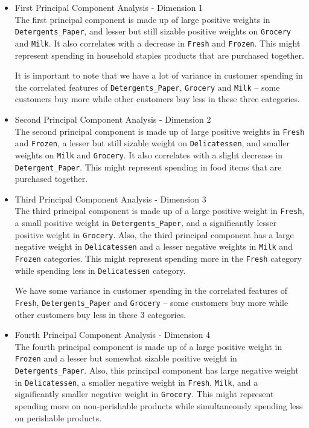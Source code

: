 \documentclass[twoside,openright,titlepage,numbers=noenddot,headinclude,%
               footinclude=true,cleardoublepage=empty,abstractoff,BCOR=5mm,%
               paper=a4,fontsize=11pt,ngerman,american]{scrreprt}
\numberwithin{theorem}{chapter}
\numberwithin{definition}{chapter}
\numberwithin{algorithm}{chapter}
\numberwithin{figure}{chapter}
\numberwithin{table}{chapter}
\numberwithin{equation}{chapter}
\begin{document}
\begin{itemize}

\item First Principal Component Analysis - Dimension 1 \\
The first principal component is made up of large positive weights in \texttt{Detergents\_Paper}, and lesser but still sizable positive weights on \texttt{Grocery} and \texttt{Milk}. It also correlates with a decrease in \texttt{Fresh} and \texttt{Frozen}. This might represent spending in household staples products that are purchased together. 

It is important to note that we have a lot of variance in customer spending in the correlated features of \texttt{Detergents\_Paper}, \texttt{Grocery} and \texttt{Milk} -- some customers buy more while other customers buy less in these three categories.

\item Second Principal Component Analysis - Dimension 2\\
The second principal component is made up of large positive weights in \texttt{Fresh} and \texttt{Frozen}, a lesser but still sizable weight on \texttt{Delicatessen}, and smaller weights on \texttt{Milk} and \texttt{Grocery}. It also correlates with a slight decrease in \texttt{Detergent\_Paper}. This might represent spending in food items that are purchased together.

\item Third Principal Component Analysis - Dimension 3\\
The third principal component is made up of a large positive weight in \texttt{Fresh}, a small positive weight in \texttt{Detergents\_Paper}, and a significantly lesser positive weight in \texttt{Grocery}. Also, the third principal component has a large negative weight in \texttt{Delicatessen} and a lesser negative weights in \texttt{Milk} and \texttt{Frozen} categories. This might represent spending more in the \texttt{Fresh} category while spending less in \texttt{Delicatessen} category.

We have some variance in customer spending in the correlated features of \texttt{Fresh}, \texttt{Detergents\_Paper} and \texttt{Grocery} -- some customers buy more while other customers buy less in these 3 categories.


\item Fourth Principal Component Analysis - Dimension 4\\
The fourth principal component is made up of a large positive weight in \texttt{Frozen} and a lesser but somewhat sizable positive weight in \texttt{Detergents\_Paper}. Also, this principal component has large negative weight in \texttt{Delicatessen}, a smaller negative weight in \texttt{Fresh}, \texttt{Milk}, and a significantly smaller negative weight in \texttt{Grocery}. This might represent spending more on non-perishable products while simultaneously spending less on perishable products.
\end{itemize}
\end{document}
